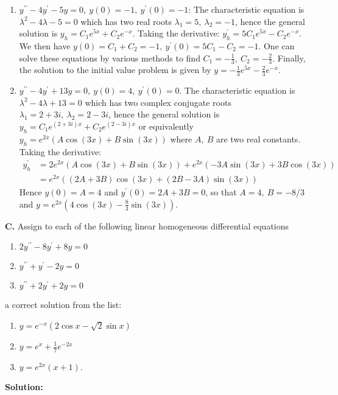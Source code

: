 \documentclass[11pt,a4paper,twoside]{article}
\begin{document}
\begin{enumerate}
		\item $y^{\prime\prime} -4y^\prime -5y = 0,\ y(0) = -1,\ y^\prime(0) = -1$: The characteristic equation is $\lambda^2-4\lambda - 5 = 0$ which has two real roots $\lambda_1 = 5,\ \lambda_2 = -1$, hence the general solution is $y_h = C_1e^{5x}+C_2e^{-x}$. Taking the derivative: $y_h^\prime = 5C_1e^{5x} - C_2e^{-x}$. We then have $y(0) = C_1+C_2 = -1,\ y^\prime(0) = 5C_1-C_2=-1$. One can solve these equations by various methods to find $C_1 = -\frac{1}{3},\ C_2 = -\frac{2}{3}$. Finally, the solution to the initial value problem is given by $y = -\frac{1}{3}e^{5x}-\frac{2}{3}e^{-x}$.
		\item $y^{\prime\prime} - 4y^\prime + 13y = 0,\ y(0) = 4,\ y^\prime(0) = 0$. The characteristic equation is $\lambda^2-4\lambda+13=0$ which has two complex conjugate roots $\lambda_1 = 2+3i,\ \lambda_2 = 2-3i$, hence the general solution is $y_h = C_1e^{(2+3i)x} + C_2e^{(2-3i)x}$ or equivalently $y_h = e^{2x}(A\cos(3x) + B\sin(3x))$ where $A,\ B$ are two real constants. Taking the derivative:
		\begin{equation*}
			\begin{aligned}
				y^\prime_h
				&= 2e^{2x}(A\cos(3x)+B\sin(3x)) + e^{2x}(-3A\sin(3x) + 3B\cos(3x))\\
				&= e^{2x}((2A+3B)\cos(3x) + (2B-3A)\sin(3x))
			\end{aligned}
		\end{equation*}
		Hence $y(0) = A = 4$ and $y^\prime(0) = 2A+3B = 0$, so that $A = 4,\ B = −8/3$ and $y=e^{2x}(4\cos(3x) - \frac{8}{3}\sin(3x))$.
	\end{enumerate}
	\textbf{C.} Assign to each of the following linear homogeneous differential equations
	\begin{enumerate}[\bfseries 1)]
		\item $2y^{\prime\prime} - 8y^\prime + 8y = 0$
		\item $y^{\prime\prime} + y^\prime - 2y = 0$
		\item $y^{\prime\prime} + 2y^\prime + 2y = 0$
	\end{enumerate}
	a correct solution from the list:
	\begin{enumerate}[\bfseries i)]
		\item $y = e^{-x}(2\cos x - \sqrt{2}\sin x)$
		\item $y = e^x + \frac{1}{7}e^{-2x}$
		\item $y = e^{2x}(x+1)$.
	\end{enumerate}
	\textbf{Solution:}
\end{document}
